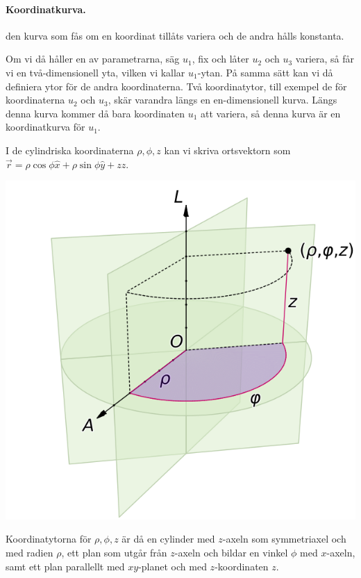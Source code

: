 \documentclass[%
oneside,                 %
final,                   %
10pt]{article}
\newenvironment{notice_mdfboxadmon}[1][]{
\begin{notice_mdfboxmdframed}[frametitle=#1]
}
{
\end{notice_mdfboxmdframed}
}
\begin{document}
\paragraph{Koordinatkurva.}
den kurva som fås om en koordinat tillåts variera och de andra hålls konstanta.

Om vi då håller en av parametrarna, säg $u_1$, fix och låter $u_2$ och $u_3$ variera, så får vi en två-dimensionell yta, vilken vi kallar $u_1$-ytan. På samma sätt kan vi då definiera ytor för de andra koordinaterna. Två koordinatytor, till exempel de för koordinaterna $u_2$ och $u_3$, skär varandra längs en en-dimensionell kurva.  Längs denna kurva kommer då bara koordinaten $u_1$ att variera, så denna kurva är en koordinatkurva för $u_1$.


\begin{notice_mdfboxadmon}
I de cylindriska koordinaterna $\rho, \phi, z$ kan vi skriva ortsvektorn som $\vec{r} = \rho\cos \phi \hat{x} + \rho\sin \phi \hat{y} + z \hat{z}$. 



\vspace{6mm}

\centerline{\includegraphics[width=0.8\linewidth]{fig/620px-Coord_system_CY.png}}

\vspace{6mm}



Koordinatytorna för $\rho, \phi, z$ är då en cylinder med $z$-axeln som symmetriaxel och med radien $\rho$, ett plan som utgår från $z$-axeln och bildar en vinkel $\phi$ med $x$-axeln, samt ett plan parallellt med $xy$-planet och med $z$-koordinaten $z$. 




\end{notice_mdfboxadmon}
\end{document}
